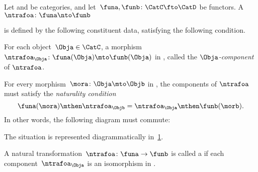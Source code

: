 \begin{ctdefinition}
  \label{def:natural-transformation}
  Let \CatC and \CatD be categories, and let~$\funa,\funb\colon \CatC\fto \CatD$ be functors. A \emph{}~$\ntrafoa \colon \funa\nto \funb$
  \begin{center}
  \end{center}
  is defined by the following constituent data, satisfying the following condition.\\
  \constit
  \begin{compactenum}
    \item For each object~$\Obja\in \CatC$, a morphism $\ntrafoa_\Obja \colon \funa(\Obja)\mto \funb(\Obja)$ in \CatD, called the $\Obja$\emph{-component} of $\ntrafoa$.
  \end{compactenum}
  \condit
  \begin{compactenum}
    \item For every morphism~$\mora\colon \Obja\mto \Objb$ in \CatC, the components of $\ntrafoa$ must satisfy the \emph{naturality condition}
    \begin{equation}
      \funa(\mora)\mthen \ntrafoa_\Objb = \ntrafoa_\Obja\mthen \funb(\morb).
    \end{equation}
    In other words, the following diagram must commute:
    \begin{center}
    \end{center}
  \end{compactenum}
  The situation is represented diagrammatically in~\cref{fig:nat_trans_graphically}.
\end{ctdefinition}

\begin{figure}[h!]
  \begin{center}
  \end{center}
  \caption{
  \label{fig:nat_trans_graphically}}
\end{figure}

\begin{ctdefinition}
  \label{def:nat_iso}
  A natural transformation~$\ntrafoa \colon \funa \to \funb $ is called a \emph{} if each component~$\ntrafoa_\Obja$ is an isomorphism in \CatD.
\end{ctdefinition}

